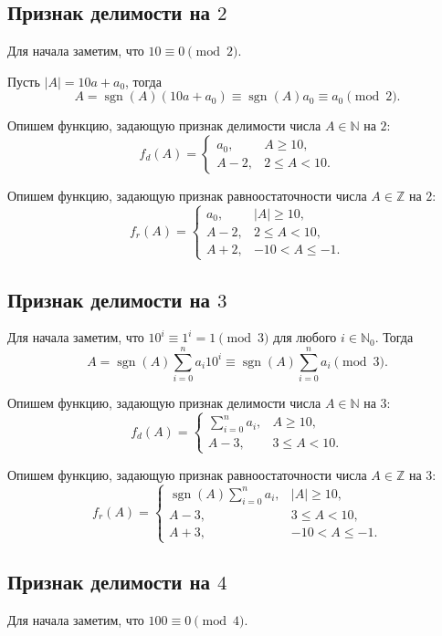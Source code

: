 \documentclass[14pt, a4paper]{extarticle}
\theoremstyle{definition}
\DeclareMathOperator{\sgn}{sgn}
\begin{document}
\subsection{Признак делимости на $2$}

	Для начала заметим, что $10\equiv0\pmod2$.
	
	Пусть $|A|=10a+a_0$, тогда
	$$A=\sgn(A)(10a+a_0)\equiv\sgn(A)a_0\equiv a_0\pmod2.$$
	
	Опишем функцию, задающую признак делимости числа $A\in\mathbb{N}$ на $2$:
	$$f_d(A)=\begin{cases}
		a_0,&A\geqslant10,\\
		A-2,&2\leqslant A<10.
	\end{cases}$$

	Опишем функцию, задающую признак равноостаточности числа $A\in\mathbb{Z}$ на $2$:
	$$f_r(A)=\begin{cases}
		a_0,&|A|\geqslant10,\\
		A-2,&2\leqslant A<10,\\
		A+2,&-10<A\leqslant-1.
	\end{cases}$$

\subsection{Признак делимости на $3$}

	Для начала заметим, что $10^i\equiv1^i=1\pmod3$ для любого $i\in\mathbb{N}_0$. Тогда
	$$A=\sgn(A)\sum_{i=0}^na_i10^i\equiv\sgn(A)\sum_{i=0}^na_i\pmod3.$$

	Опишем функцию, задающую признак делимости числа $A\in\mathbb{N}$ на $3$:
	$$f_d(A)=\begin{cases}
		\sum_{i=0}^na_i,&A\geqslant10,\\
		A-3,&3\leqslant A<10.
	\end{cases}$$

	Опишем функцию, задающую признак равноостаточности числа $A\in\mathbb{Z}$ на $3$:
	$$f_r(A)=\begin{cases}
		\sgn(A)\sum_{i=0}^na_i,&|A|\geqslant10,\\
		A-3,&3\leqslant A<10,\\
		A+3,&-10<A\leqslant-1.
	\end{cases}$$

\subsection{Признак делимости на $4$}

	Для начала заметим, что $100\equiv0\pmod4$.
	
\end{document}
